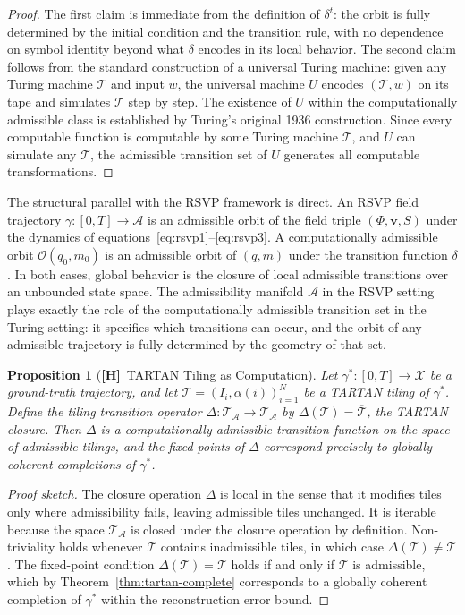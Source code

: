 \documentclass[11pt, oneside]{article}
\numberwithin{equation}{section}
\newcommand{\ClaimH}{\textcolor{rsvpgray}{\textbf{[H]}}}
\theoremstyle{rsvpstyle}
\newtheorem{proposition}[theorem]{Proposition}
\theoremstyle{remark}
\newcommand{\vfield}{\mathbf{v}}
\newcommand{\Adm}{\mathcal{A}}
\begin{document}
\begin{proof}
The first claim is immediate from the definition of $\delta^t$: the orbit is fully
determined by the initial condition and the transition rule, with no dependence on
symbol identity beyond what $\delta$ encodes in its local behavior. The second claim
follows from the standard construction of a universal Turing machine: given any
Turing machine $\mathcal{T}$ and input $w$, the universal machine $U$ encodes
$(\mathcal{T}, w)$ on its tape and simulates $\mathcal{T}$ step by step. The
existence of $U$ within the computationally admissible class is established by
Turing's original 1936 construction. Since every computable function is computable
by some Turing machine $\mathcal{T}$, and $U$ can simulate any $\mathcal{T}$, the
admissible transition set of $U$ generates all computable transformations.
\end{proof}

The structural parallel with the RSVP framework is direct. An RSVP field trajectory
$\gamma : [0, T] \to \Adm$ is an admissible orbit of the field triple $(\Phi, \vfield, S)$
under the dynamics of equations~\eqref{eq:rsvp1}--\eqref{eq:rsvp3}. A computationally
admissible orbit $\mathcal{O}(q_0, m_0)$ is an admissible orbit of $(q, m)$ under
the transition function $\delta$. In both cases, global behavior is the closure of
local admissible transitions over an unbounded state space. The admissibility manifold
$\Adm$ in the RSVP setting plays exactly the role of the computationally admissible
transition set in the Turing setting: it specifies which transitions can occur, and
the orbit of any admissible trajectory is fully determined by the geometry of that
set.

\begin{proposition}[\ClaimH\ TARTAN Tiling as Computation]
\label{prop:tartan-turing}
Let $\gamma^* : [0, T] \to \mathcal{X}$ be a ground-truth trajectory, and let
$\mathcal{T} = (I_i, \alpha(i))_{i=1}^N$ be a TARTAN tiling of $\gamma^*$. Define
the tiling transition operator $\Delta : \mathcal{T}_{\Adm} \to \mathcal{T}_{\Adm}$
by $\Delta(\mathcal{T}) = \overline{\mathcal{T}}$, the TARTAN closure. Then $\Delta$
is a computationally admissible transition function on the space of admissible tilings,
and the fixed points of $\Delta$ correspond precisely to globally coherent completions
of $\gamma^*$.
\end{proposition}

\begin{proof}[Proof sketch]
The closure operation $\Delta$ is local in the sense that it modifies tiles only
where admissibility fails, leaving admissible tiles unchanged. It is iterable because
the space $\mathcal{T}_{\Adm}$ is closed under the closure operation by definition.
Non-triviality holds whenever $\mathcal{T}$ contains inadmissible tiles, in which case
$\Delta(\mathcal{T}) \neq \mathcal{T}$. The fixed-point condition $\Delta(\mathcal{T})
= \mathcal{T}$ holds if and only if $\mathcal{T}$ is admissible, which by
Theorem~\ref{thm:tartan-complete} corresponds to a globally coherent completion of
$\gamma^*$ within the reconstruction error bound.
\end{proof}
\end{document}
